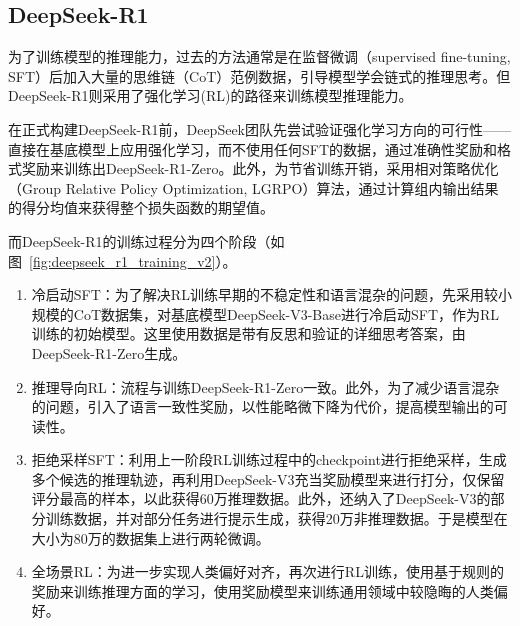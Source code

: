 
\subsection{DeepSeek-R1}

为了训练模型的推理能力，过去的方法通常是在监督微调（supervised fine-tuning, SFT）后加入大量的思维链（CoT）范例数据，引导模型学会链式的推理思考。但DeepSeek-R1则采用了强化学习(RL)的路径来训练模型推理能力。

在正式构建DeepSeek-R1前，DeepSeek团队先尝试验证强化学习方向的可行性——直接在基底模型上应用强化学习，而不使用任何SFT的数据，通过准确性奖励和格式奖励来训练出DeepSeek-R1-Zero。此外，为节省训练开销，采用相对策略优化（Group Relative Policy Optimization, LGRPO）算法，通过计算组内输出结果的得分均值来获得整个损失函数的期望值。

而DeepSeek-R1的训练过程分为四个阶段（如图~\ref{fig:deepseek_r1_training_v2}）。
\begin{enumerate}
    \item 冷启动SFT：为了解决RL训练早期的不稳定性和语言混杂的问题，先采用较小规模的CoT数据集，对基底模型DeepSeek-V3-Base进行冷启动SFT，作为RL训练的初始模型。这里使用数据是带有反思和验证的详细思考答案，由DeepSeek-R1-Zero生成。
    \item 推理导向RL：流程与训练DeepSeek-R1-Zero一致。此外，为了减少语言混杂的问题，引入了语言一致性奖励，以性能略微下降为代价，提高模型输出的可读性。
    \item 拒绝采样SFT：利用上一阶段RL训练过程中的checkpoint进行拒绝采样，生成多个候选的推理轨迹，再利用DeepSeek-V3充当奖励模型来进行打分，仅保留评分最高的样本，以此获得60万推理数据。此外，还纳入了DeepSeek-V3的部分训练数据，并对部分任务进行提示生成，获得20万非推理数据。于是模型在大小为80万的数据集上进行两轮微调。
    \item 全场景RL：为进一步实现人类偏好对齐，再次进行RL训练，使用基于规则的奖励来训练推理方面的学习，使用奖励模型来训练通用领域中较隐晦的人类偏好。
\end{enumerate}

